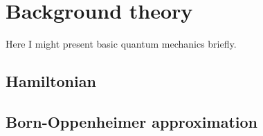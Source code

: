 \section{Background theory}
Here I might present basic quantum mechanics briefly.

\subsection{Hamiltonian}

\subsection{Born-Oppenheimer approximation}